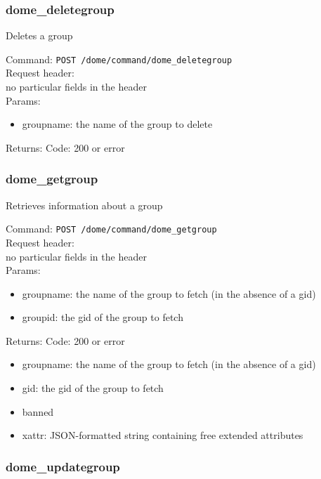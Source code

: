 \documentclass[a4paper,10pt]{scrreprt}
\begin{document}
\subsubsection{dome\_deletegroup}

Deletes a group

Command:
\lstinline"POST /dome/command/dome_deletegroup"\\

Request header:\\
no particular fields in the header\\

Params:
\begin{itemize}
 \item groupname: the name of the group to delete
\end{itemize}

Returns:
Code: 200 or error




\subsubsection{dome\_getgroup}

Retrieves information about a group

Command:
\lstinline"POST /dome/command/dome_getgroup"\\

Request header:\\
no particular fields in the header\\

Params:
\begin{itemize}
 \item groupname: the name of the group to fetch (in the absence of a gid)
 \item groupid: the gid of the group to fetch
\end{itemize}

Returns:
Code: 200 or error
\begin{itemize}
 \item groupname: the name of the group to fetch (in the absence of a gid)
 \item gid: the gid of the group to fetch
 \item banned
 \item xattr: JSON-formatted string containing free extended attributes
\end{itemize}


\subsubsection{dome\_updategroup}
\end{document}
